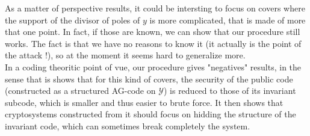 \documentclass[10pt]{article}
\newcommand{\Y}{\mathcal{Y}}
\begin{document}
As a matter of perspective results, it could be intersting to focus on covers where the support of the divisor of poles of $y$ is more complicated, that is made of more that one point. In fact, if those are known, we can show that our procedure still works. The fact is that we have no reasons to know it (it actually is the point of the attack !), so at the moment it seems hard to generalize more. \\
In a coding theoritic point of vue, our procedure gives "negatives" results, in the sense that is shows that for this kind of covers, the security of the public code (constructed as a structured AG-code on $\Y$) is reduced to those of its invariant subcode, which is smaller and thus easier to brute force. It then shows that cryptosystems constructed from it should focus on hidding the structure of the invariant code, which can sometimes break completely the system.



\newpage


\end{document}
